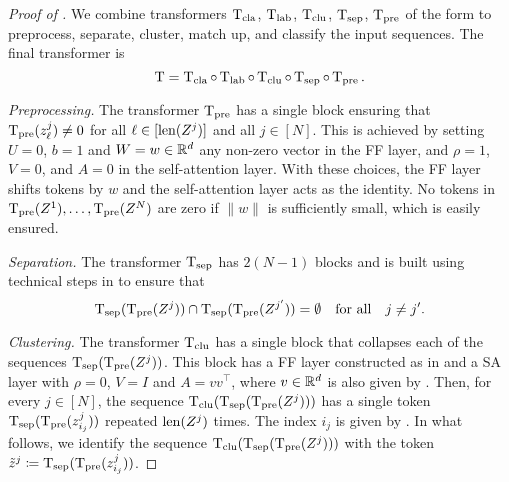 \documentclass[11pt,a4paper]{amsart}
\begin{document}
\begin{proof}[Proof of ]
We combine transformers $\operatorname{\mathrm{T}}_{\text{cla}}$, $\operatorname{\mathrm{T}}_{\text{lab}}$, $\operatorname{\mathrm{T}}_{\text{clu}}$, $\operatorname{\mathrm{T}}_{\text{sep}}$, $\operatorname{\mathrm{T}}_{\text{pre}}$ of the form  to preprocess, separate, cluster, match up, and classify the input sequences. The final transformer is 
\begin{equation}
\operatorname{\mathrm{T}} = \operatorname{\mathrm{T}}_{\text{cla}} \circ \operatorname{\mathrm{T}}_{\text{lab}} \circ \operatorname{\mathrm{T}}_{\text{clu}} \circ \operatorname{\mathrm{T}}_{\text{sep}} \circ \operatorname{\mathrm{T}}_{\text{pre}}.
\end{equation}

\noindent\textit{Preprocessing.} The transformer $\operatorname{\mathrm{T}}_{\text{pre}}$ has a single block ensuring that $\operatorname{\mathrm{T}}_{\text{pre}}(z_\ell^j) \neq 0$ for all $\ell \in [\operatorname{len} (Z^j)]$ and all $j\in [N]$. This is achieved by setting $U = 0$, $b=1$ and $W = w \in \mathbb{R}^d$ any non-zero vector in the FF layer, and $\rho = 1$, $V = 0$, and $A=0$ in the self-attention layer. With these choices, the FF layer shifts tokens by $w$ and the self-attention layer acts as the identity. No tokens in $\operatorname{\mathrm{T}}_{\text{pre}}(Z^1),\ldots,\operatorname{\mathrm{T}}_{\text{pre}}(Z^N)$ are zero if $\| w\|$ is sufficiently small, which is easily ensured.
\vspace{3mm}

\noindent\textit{Separation.} The transformer $\operatorname{\mathrm{T}}_{\text{sep}}$ has $2(N-1)$ blocks and is built using technical steps in  to ensure that 
\begin{equation}
\operatorname{\mathrm{T}}_{\text{sep}}(\operatorname{\mathrm{T}}_{\text{pre}}(Z^j)) \cap \operatorname{\mathrm{T}}_{\text{sep}}(\operatorname{\mathrm{T}}_{\text{pre}}(Z^{j'})) = \emptyset \quad \text{for all} \quad j\neq j'.
\end{equation}

\noindent\textit{Clustering.} The transformer $\operatorname{\mathrm{T}}_{\text{clu}}$ has a single block that collapses each of the sequences $\operatorname{\mathrm{T}}_{\text{sep}}(\operatorname{\mathrm{T}}_{\text{pre}}(Z^j))$. This block has a FF layer constructed as in  and a SA layer with $\rho = 0$, $V = I$ and $A=v v^\top$, where $v \in \mathbb{R}^d$ is also given by . Then, for every $j\in [N]$, the sequence $\operatorname{\mathrm{T}}_{\text{clu}}(\operatorname{\mathrm{T}}_{\text{sep}}(\operatorname{\mathrm{T}}_{\text{pre}}(Z^j)))$ has a single token $\operatorname{\mathrm{T}}_{\text{sep}}(\operatorname{\mathrm{T}}_{\text{pre}}(z_{i_j}^j))$ repeated $\operatorname{len}(Z^j)$ times. The index $i_j$ is given by . In what follows, we identify the sequence $\operatorname{\mathrm{T}}_{\textrm{clu}}(\operatorname{\mathrm{T}}_{\text{sep}}(\operatorname{\mathrm{T}}_{\text{pre}}(Z^j)))$ with the token $\Tilde{z}^j \coloneqq \operatorname{\mathrm{T}}_{\text{sep}}(\operatorname{\mathrm{T}}_{\text{pre}}(z_{i_j}^j))$.
\vspace{3mm}


\end{proof}
\end{document}
